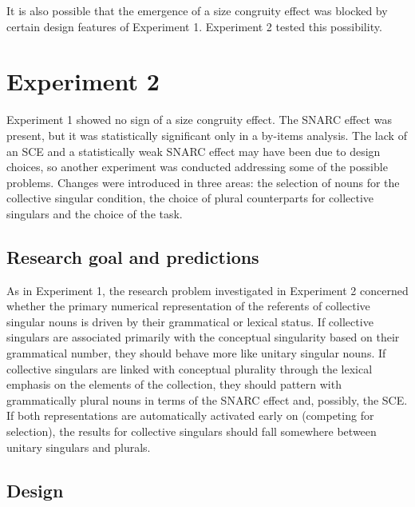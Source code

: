 \documentclass[output=paper]{langscibook}
\begin{document}
It is also possible that the emergence of a size congruity effect was blocked by certain design features of Experiment 1. Experiment 2 tested this possibility. 

\section{Experiment 2}
Experiment 1 showed no sign of a size congruity effect. The SNARC effect was present, but it was statistically significant only in a by-items analysis. The lack of an SCE and a statistically weak SNARC effect may have been due to design choices, so another experiment was conducted addressing some of the possible problems. Changes were introduced in three areas: the selection of nouns for the collective singular condition, the choice of plural counterparts for collective singulars and the choice of the task.

\subsection{Research goal and predictions}
As in Experiment 1, the research problem investigated in Experiment 2 concerned whether the primary numerical representation of the referents of collective singular nouns is driven by their grammatical or lexical status.  If collective singulars are associated primarily with the conceptual singularity based on their grammatical number, they should behave more like unitary singular nouns. If collective singulars are linked with conceptual plurality through the lexical emphasis on the elements of the collection, they should pattern with grammatically plural nouns in terms of the SNARC effect and, possibly, the SCE. If both representations are automatically activated early on (competing for selection), the results for collective singulars should fall somewhere between unitary singulars and plurals.

\subsection{Design}
\end{document}
